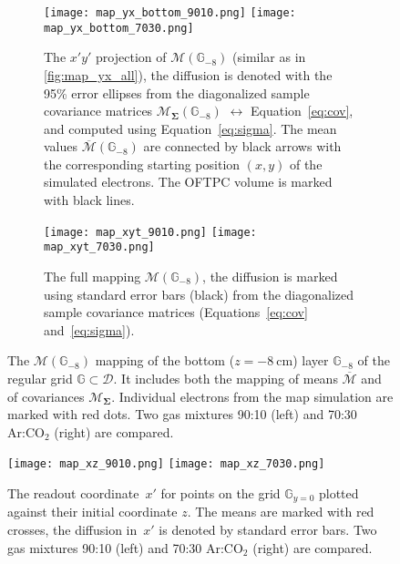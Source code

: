 		\begin{figure}
			\centering
			\begin{subfigure}[t]{\textwidth}
				\centering
				\texttt{[image: map\_yx\_bottom\_9010.png]}
				\hfill
				\texttt{[image: map\_yx\_bottom\_7030.png]}
				\caption{The $x'y'$ projection of $\mathcal{M}(\mathbb{G}_{-8})$ (similar as in \cref{fig:map_yx_all}), the diffusion is denoted with the 95\% error ellipses from  the diagonalized sample covariance matrices $\mathcal{M}_\mathbf{\Sigma}(\mathbb{G}_{-8})$ $\leftrightarrow$ Equation~\ref{eq:cov}, and computed using Equation~\ref{eq:sigma}. The mean values $\overline{\mathcal{M}}(\mathbb{G}_{-8})$ are connected by black arrows with the corresponding starting position $(x,y)$ of the simulated electrons. The \ac{OFTPC} volume is marked with black lines.}
				\label{fig:map_yx_bot}
			\end{subfigure}
			
			\begin{subfigure}[t]{\textwidth}
				\centering
				\texttt{[image: map\_xyt\_9010.png]}
				\hfill
				\texttt{[image: map\_xyt\_7030.png]}
				\caption{The full mapping $\mathcal{M}(\mathbb{G}_{-8})$, the diffusion is marked using standard error bars (black) from the diagonalized sample covariance matrices (Equations~\ref{eq:cov} and~\ref{eq:sigma}).}
				\label{fig:map_xyt}
			\end{subfigure}
			\caption{The $\mathcal{M}(\mathbb{G}_{-8})$ mapping of the bottom ($z = \qty{-8}{\centi\meter}$) layer $\mathbb{G}_{-8}$ of the regular grid $\mathbb{G}\subset\mathcal{D}$. It includes both the mapping of means $\overline{\mathcal{M}}$ and of covariances $\mathcal{M}_\mathbf{\Sigma}$. Individual electrons from the map simulation are marked with red dots. Two gas mixtures 90:10 (left) and 70:30 Ar:CO$_2$ (right) are compared.}
			\label{fig:map_bot}
		\end{figure}
		
		\begin{figure}
			\centering
			\texttt{[image: map\_xz\_9010.png]}
			\hfill
			\texttt{[image: map\_xz\_7030.png]}
			\caption{The readout coordinate~$x'$ for points on the grid $\mathbb{G}_{y=0}$ plotted against their initial coordinate $z$. The means are marked with red crosses, the diffusion in~$x'$ is denoted by standard error bars. Two gas mixtures 90:10 (left) and 70:30 Ar:CO$_2$ (right) are compared.}
			\label{fig:map_xz}
		\end{figure}
		
